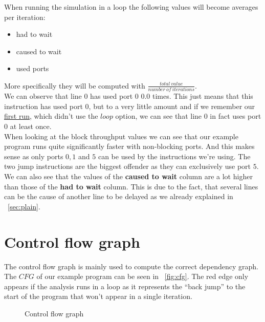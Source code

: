 \documentclass[a4paper,12pt,titlepage, twoside]{report}
\begin{document}
When running the simulation in a loop the following values will become averages per iteration:

\begin{itemize}
    \item had to wait
    \item caused to wait
    \item used ports
\end{itemize} 

More specifically they will be computed with $\frac{total\ value}{number\ of\ iterations}$.\\
We can observe that line $0$ has used port $0$ $0.0$ times. This just means that this instruction has used port $0$, but to a very little amount and if we remember our \hyperref[sec:plain]{first run}, which didn't use the $loop$ option, we can see that line $0$ in fact uses port $0$ at least once.\\
When looking at the block throughput values we can see that our example program runs quite significantly faster with non-blocking ports. And this makes sense as only ports $0, 1$ and $5$ can be used by the instructions we're using. The two jump instructions are the biggest offender as they can exclusively use port $5$.\\
We can also see that the values of the \textbf{caused to wait} column are a lot higher than those of the \textbf{had to wait} column. This is due to the fact, that several lines can be the cause of another line to be delayed as we already explained in ~\autoref{sec:plain}.

\section{Control flow graph}
The control flow graph is mainly used to compute the correct dependency graph. The $CFG$ of our example program can be seen in ~\autoref{fig:cfg}. The red edge only appears if the analysis runs in a loop as it represents the ``back jump'' to the start of the program that won't appear in a single iteration.

\begin{figure}
    \centering
    \caption{Control flow graph}
    \label{fig:cfg}
\end{figure}
\end{document}
